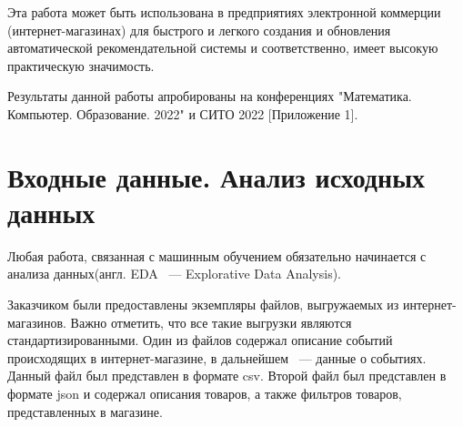 \documentclass[14pt]{mmcs_article}
\begin{document}



Эта работа может быть использована в предприятиях электронной коммерции (интернет-магазинах) для быстрого и легкого создания и обновления автоматической рекомендательной системы и соответственно, имеет высокую практическую значимость.

Результаты данной работы апробированы на конференциях "Математика. Компьютер. Образование. 2022" и СИТО 2022 [Приложение 1].

\newpage


\section{Входные данные. Анализ исходных данных}\label{dsfs}
Любая работа, связанная с машинным обучением обязательно начинается с анализа данных(англ. EDA ~--- Explorative Data Analysis).

Заказчиком были предоставлены экземпляры файлов, выгружаемых из интернет-магазинов. Важно отметить, что все такие выгрузки являются стандартизированными. Один из файлов содержал описание событий происходящих в интернет-магазине, в дальнейшем ~--- данные о событиях. Данный файл был представлен в формате csv. Второй файл был представлен в формате json и содержал описания товаров, а также фильтров товаров, представленных в магазине. 
\end{document}
